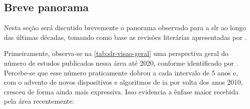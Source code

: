 \subsection{Breve panorama}
\label{sec:slr-breve-panorama}


Nesta seção será discutido brevemente o panorama observado para a \acrshort{slr} ao longo das últimas décadas, tomando como base as revisões literárias apresentadas por .




Primeiramente, observa-se na \autoref{tab:slr-visao-geral} uma perspectiva geral do número de estudos publicados nessa área até 2020, conforme identificado por .
Percebe-se que esse número praticamente dobrou a cada intervalo de 5 anos e, com o advento de novos dispositivos e algoritmos de \acrshort{ia} por volta dos anos 2010, cresceu de forma ainda mais expressiva. Isso evidencia a ênfase maior recebida pela área recentemente.

